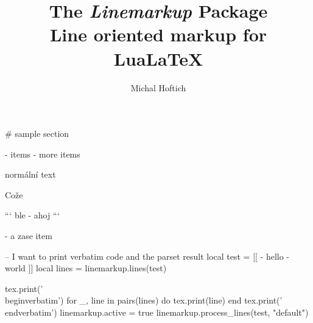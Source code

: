 \documentclass{article}
\begin{document}
\title{The \textit{Linemarkup} Package\\Line oriented markup for LuaLaTeX}
\author{Michal Hoftich}

\maketitle





# sample section

- items 
- more items

\bgroup
\noindent normální text
\egroup

Cože

```
ble
- ahoj
```

- a zase item

\LinemarkupDisable



\LinemarkupDisable
\begin{luacode*}
  -- I want to print verbatim code and the parset result
local test = [[
- hello
- world
]]
local lines = linemarkup.lines(test)

tex.print('\\begin{verbatim}')
for _, line in pairs(lines) do
  tex.print(line)
end
tex.print('\\end{verbatim}')
linemarkup.active = true
linemarkup.process_lines(test, "default")
\end{luacode*}
\LinemarkupEnable




\end{document}
